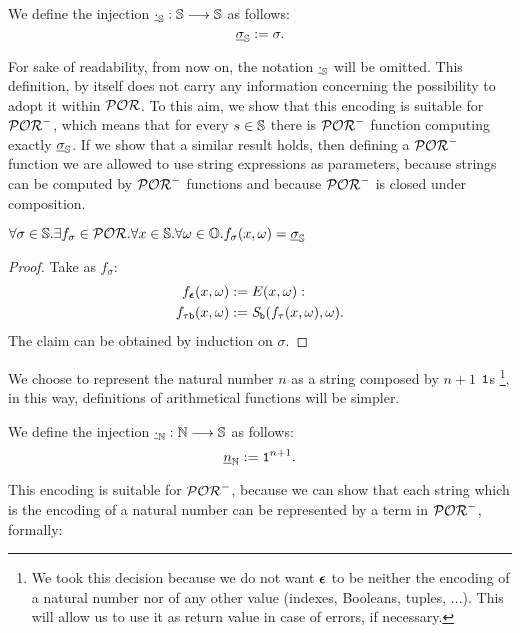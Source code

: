 \begin{defn}
  We define the injection ${\underline{\cdot}}_{\mathbb{S}}:  \mathbb{S} \longrightarrow \mathbb{S}$ as
  follows:
  \[
  {\underline{\sigma}}_{\mathbb{S}}:= \sigma.
  \]
\end{defn}
\noindent
For sake of readability, from now on, the notation $\underline \cdot_{\mathbb{S}}$
will be omitted.
%
This definition, by itself does not carry any information concerning the possibility to adopt it within $\mathcal{POR}$. To this aim, we show that this encoding is suitable for $\mathcal{POR}^-$,
which means that for every $s \in \mathbb{S}$ there is
$\mathcal{POR}^-$ function computing exactly ${\underline{\sigma}}_{\mathbb{S}}$.
If we show that a similar result holds, then defining a $\mathcal{POR}^-$ function we are allowed to use string expressions as parameters, because strings can be computed by $\mathcal{POR}^-$ functions and because $\mathcal{POR}^-$ is closed under composition.

\begin{remark}
  $\forall \sigma \in \mathbb{S}. \exists f_\sigma \in \mathcal{POR}. \forall x\in \mathbb{S}.\forall  \omega \in \mathbb{O}.
  f_\sigma(x, \omega)= {\underline{\sigma}}_{\mathbb{S}}$
\end{remark}
\begin{proof}
  Take as $f_\sigma$:
  \begin{align*}
    {f_{\bm{\epsilon}}}(x, \omega) &:= E(x, \omega): \\
    {f_{\tau\mathtt{b}}}(x, \omega)&:= \emph{S}_{\mathtt{b}}(f_\tau(x, \omega),\omega).
  \end{align*}
  The claim can be obtained by induction on $\sigma$.
\end{proof}


We choose to represent the natural number $n$ as a string composed by $n+1$
$\mathtt{1}$s
\footnote{We took this decision because we do not want $\bm{\epsilon}$ to be neither
the encoding of a natural number nor of any other value (indexes, Booleans, tuples, ...).
This will allow us to use it as return value in case of errors, if necessary.},
in this way, definitions of arithmetical functions will be simpler.

\begin{defn}
  We define the injection ${\underline{\cdot}}_{\mathbb{N}}:  \mathbb{N} \longrightarrow \mathbb{S}$ as
  follows:
  \[
  {\underline{n}}_{\mathbb{N}}:= \mathtt{1}^{n+1}.
  \]
\end{defn}

This encoding is suitable for $\mathcal{POR}^-$, because we can show that each string
which is the encoding of a natural number can be represented by a term in $\mathcal{POR}^-$,
formally:

